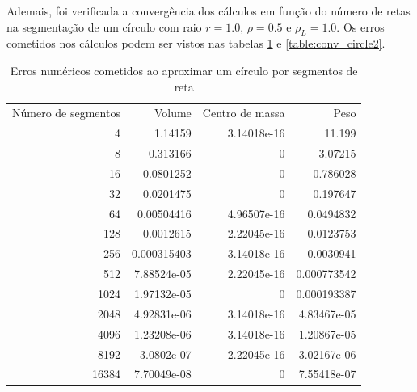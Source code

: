 \documentclass[
	12pt,				%
	oneside,			%
	a4paper,			%
	]{article}
\begin{document}
    Ademais, foi verificada a convergência dos cálculos em função do número de retas na segmentação de um círculo com raio $r= 1.0$, $\rho = 0.5$ e $\rho_L=1.0$. Os erros cometidos nos cálculos podem ser vistos nas tabelas \ref{table:conv_circle1} e \ref{table:conv_circle2}.
    \begin{table}[H]
        \centering
        \begin{tabular}{rrrr} \\

            
            \hline
 \\
\hline
            Número de segmentos &      Volume &   Centro de massa &        Peso \\

            \hline
                                4 &     1.14159 &       3.14018e-16 &      11.199 \\
                                8 &    0.313166 &                 0 &     3.07215 \\
                                16 &   0.0801252 &                 0 &    0.786028 \\
                                32 &   0.0201475 &                 0 &    0.197647 \\
                                64 &  0.00504416 &       4.96507e-16 &   0.0494832 \\
                            128 &   0.0012615 &       2.22045e-16 &   0.0123753 \\
                            256 & 0.000315403 &       3.14018e-16 &   0.0030941 \\
                            512 & 7.88524e-05 &       2.22045e-16 & 0.000773542 \\
                            1024 & 1.97132e-05 &                 0 & 0.000193387 \\
                            2048 & 4.92831e-06 &       3.14018e-16 & 4.83467e-05 \\
                            4096 & 1.23208e-06 &       3.14018e-16 & 1.20867e-05 \\
                            8192 &  3.0802e-07 &       2.22045e-16 & 3.02167e-06 \\
                            16384 & 7.70049e-08 &                 0 & 7.55418e-07 \\

            \hline
        \end{tabular}
        \caption{Erros numéricos cometidos ao aproximar um círculo por segmentos de reta}
        \label{table:conv_circle1}
    \end{table} 
\end{document}
